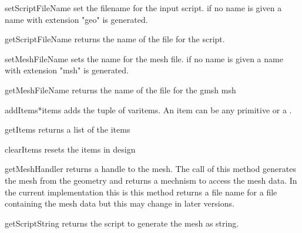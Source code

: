\begin{methoddesc}[Design]{setScriptFileName}{}
set the filename for the \gmshextern input script. if no name is given a name with extension "geo" is generated.
\end{methoddesc}

\begin{methoddesc}[Design]{getScriptFileName}{}
returns the name of the file for the \gmshextern script.
\end{methoddesc}


\begin{methoddesc}[Design]{setMeshFileName}{}
sets the name for the \gmshextern  mesh file. if no name is given a name with extension "msh" is generated.
\end{methoddesc}

\begin{methoddesc}[Design]{getMeshFileName}{}
returns the name of the file for the gmsh msh
\end{methoddesc}


\begin{methoddesc}[Design]{addItems}{*items}
adds the tuple of var{items}. An item can be any primitive or a .

\end{methoddesc}

\begin{methoddesc}[Design]{getItems}{}
returns a list of the items
\end{methoddesc}

\begin{methoddesc}[Design]{clearItems}{}
resets the items in design
\end{methoddesc}

\begin{methoddesc}[Design]{getMeshHandler}{}
returns a handle to the mesh. The call of this method generates the mesh from the geometry and
returns a mechnism to access the mesh data. In the current implementation this
is this method returns a file name for a \gmshextern file containing the mesh data but this may change in
later versions.
\end{methoddesc}

\begin{methoddesc}[Design]{getScriptString}{}
returns the \gmshextern script to generate the mesh as string.
\end{methoddesc}

